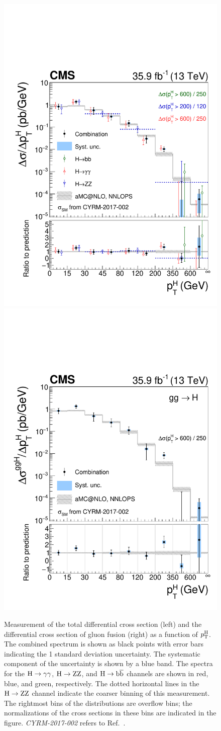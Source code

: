 \begin{figure}[hbtp]
  \begin{center}
    \includegraphics[width=0.49\linewidth]{img/differentials/spectra_pth_smH.pdf}
    \includegraphics[width=0.49\linewidth]{img/differentials/spectra_pth_ggH.pdf}
    \caption{
        Measurement of the total differential cross section (left) and the differential cross section of gluon fusion (right) as a function of $p_\mathrm{T}^\mathrm{H}$. The combined spectrum is shown as black points with error bars indicating the 1 standard deviation uncertainty. The systematic component of the uncertainty is shown by a blue band. The spectra for the $\mathrm{H}\to\mathrm{\gamma}\mathrm{\gamma}$, $\mathrm{H}\to\mathrm{Z}\mathrm{Z}$, and $\mathrm{H}\to\mathrm{b}\overline{\mathrm{b}}$ channels are shown in red, blue, and green, respectively.
        The dotted horizontal lines in the $\mathrm{H}\to\mathrm{Z}\mathrm{Z}$ channel indicate the coarser binning of this measurement.
        The rightmost bins of the distributions are overflow bins; the normalizations of the cross sections in these bins are indicated in the figure.
        \textit{CYRM-2017-002} refers to Ref.~\cite{deFlorian:2016spz}.
        }
    \label{fig:CombinedSpectra_pth}
  \end{center}
\end{figure}

